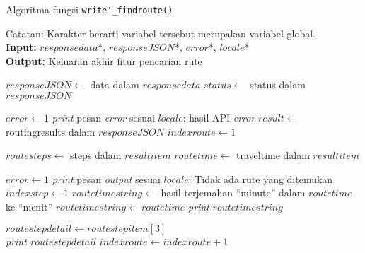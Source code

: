 \begin{algorithm}[h]
	\caption{Algoritma fungsi \texttt{write\char`_findroute()}}
	\label{alg:design-write-findroute}
	\vspace{-0.6\baselineskip}
	\begin{flushleft}
		Catatan: Karakter \textquotesingle *\textquotesingle\xspace berarti variabel tersebut merupakan variabel global. \\
		\textbf{Input:} $responsedata$*, $responseJSON$*, $error$*, $locale$* \\
		\textbf{Output:} Keluaran akhir fitur pencarian rute \\
	\end{flushleft}
	\vspace{-1.05\baselineskip}
	\begin{algorithmic}
		\State $responseJSON \gets$ data dalam $responsedata$
		\State $status \gets$ \textquotesingle\textquotesingle status\textquotesingle\textquotesingle\xspace dalam $responseJSON$
		
			\State $error \gets 1$
			\State \textit{print} pesan \textit{error} sesuai $locale$: hasil API \textit{error}
		\Else
			\State $result \gets$ \textquotesingle\textquotesingle routingresults\textquotesingle\textquotesingle\xspace dalam $responseJSON$
			\State $indexroute \gets 1$
			
			 
				\State $routesteps \gets$ \textquotesingle\textquotesingle steps\textquotesingle\textquotesingle\xspace dalam $resultitem$
				\State $routetime \gets$ \textquotesingle\textquotesingle traveltime\textquotesingle\textquotesingle\xspace dalam $resultitem$
				
					\State $error \gets 1$
					\State \textit{print} pesan \textit{output} sesuai $locale$: Tidak ada rute yang ditemukan
				\Else
					\State $indexstep \gets 1$
					 
						\State $routetimestring \gets$ hasil terjemahan ``minute'' dalam $routetime$ ke ``menit''
					\Else
						\State $routetimestring \gets routetime$
					\EndIf
					\State \textit{print} $routetimestring$
					
					 
						\State $routestepdetail \gets routestepitem[3]$ \\ 
						\State \textit{print $routestepdetail$}
					\EndFor
				\EndIf
				\State $indexroute \gets indexroute + 1$
			\EndFor
		\EndIf
	\end{algorithmic}
\end{algorithm}

